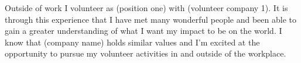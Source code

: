 Outside of work I volunteer as (position one) with (volunteer company 1). It is through this experience that I have met many wonderful people and been able to gain a greater understanding of what I want my impact to be on the world. I know that (company name) holds similar values and I'm excited at the opportunity to pursue my volunteer activities in and outside of the workplace.